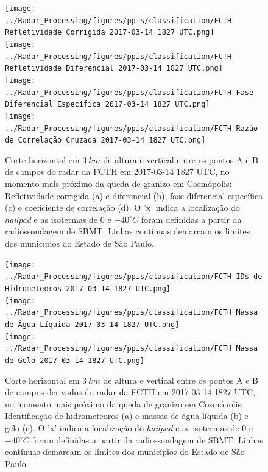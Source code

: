 \begin{figure}[hp]
	\centering
	\caption{Corte horizontal em $3\:km$ de altura e vertical entre os pontos A e B de campos do radar da FCTH em 2017-03-14 1827 UTC, no momento mais próximo da queda de granizo em Cosmópolis: Refletividade corrigida (a) e diferencial (b), fase diferencial específica (c) e coeficiente de correlação (d). O 'x' indica a localização do \textit{hailpad} e as isotermas de $0$ e $-40^{\circ}C$ foram definidas a partir da radiossondagem de SBMT. Linhas contínuas demarcam os limites dos municípios do Estado de São Paulo.}
	\label{radar_20170314_1}
	\vspace{-5pt}
	\texttt{[image: ../Radar\_Processing/figures/ppis/classification/FCTH Refletividade Corrigida 2017-03-14 1827 UTC.png]} \\
	\vspace{-5pt}
	\texttt{[image: ../Radar\_Processing/figures/ppis/classification/FCTH Refletividade Diferencial 2017-03-14 1827 UTC.png]} \\
	\vspace{-5pt}
	\texttt{[image: ../Radar\_Processing/figures/ppis/classification/FCTH Fase Diferencial Específica 2017-03-14 1827 UTC.png]} \\
	\vspace{-5pt}
	\texttt{[image: ../Radar\_Processing/figures/ppis/classification/FCTH Razão de Correlação Cruzada 2017-03-14 1827 UTC.png]} \\
\end{figure}

\begin{figure}[htb]
	\centering
	\caption{Corte horizontal em $3\:km$ de altura e vertical entre os pontos A e B de campos derivados do radar da FCTH em 2017-03-14 1827 UTC, no momento mais próximo da queda de granizo em Cosmópolis: Identificação de hidrometeoros (a) e massas de água líquida (b) e gelo (c). O 'x' indica a localização do \textit{hailpad} e as isotermas de $0$ e $-40^{\circ}C$ foram definidas a partir da radiossondagem de SBMT. Linhas contínuas demarcam os limites dos municípios do Estado de São Paulo.} 
	\label{radar_derived_20170314_1}
	\vspace{-5pt}
	\texttt{[image: ../Radar\_Processing/figures/ppis/classification/FCTH IDs de Hidrometeoros 2017-03-14 1827 UTC.png]} \\
	\vspace{-5pt}
	\texttt{[image: ../Radar\_Processing/figures/ppis/classification/FCTH Massa de Água Líquida 2017-03-14 1827 UTC.png]} \\
	\vspace{-5pt}
	\texttt{[image: ../Radar\_Processing/figures/ppis/classification/FCTH Massa de Gelo 2017-03-14 1827 UTC.png]} \\
\end{figure}

